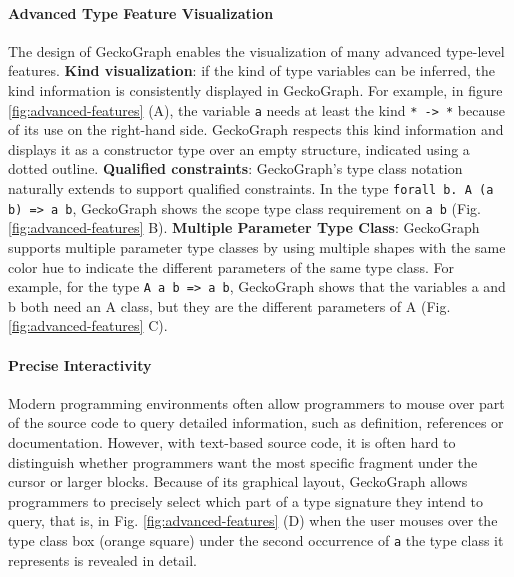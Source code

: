 \paragraph{Advanced Type Feature Visualization}
The design of GeckoGraph enables the visualization of many advanced type-level features. \textbf{Kind visualization}: if the kind of type variables can be inferred, the kind information is consistently displayed in GeckoGraph. For example, in figure \ref{fig:advanced-features} (A), the variable \texttt{a} needs at least the kind \texttt{* -> *} because of its use on the right-hand side. GeckoGraph respects this kind information and displays it as a constructor type over an empty structure, indicated using a dotted outline.  \textbf{Qualified constraints}: GeckoGraph's type class notation naturally extends to support qualified constraints. In the type \texttt{forall b. A (a b) => a b}, GeckoGraph shows the scope type class requirement on \texttt{a b} (Fig. \ref{fig:advanced-features} B).
\textbf{Multiple Parameter Type Class}:  GeckoGraph supports multiple parameter type classes by using multiple shapes with the same color hue to indicate the different parameters of the same type class.  For example, for the type \texttt{A a b => a b},  GeckoGraph shows that the variables a and b both need an A class, but they are the different parameters of A (Fig. \ref{fig:advanced-features} C).

\paragraph{Precise Interactivity}
Modern programming environments often allow programmers to mouse over part of the source code to query detailed information, such as definition, references or documentation. However, with text-based source code, it is often hard to distinguish whether programmers want the most specific fragment under the cursor or larger blocks. Because of its graphical layout, GeckoGraph allows programmers to precisely select which part of a type signature they intend to query, that is, in Fig. \ref{fig:advanced-features} (D) when the user mouses over the type class box (orange square) under the second occurrence of \texttt{a} the type class it represents is revealed in detail. 

